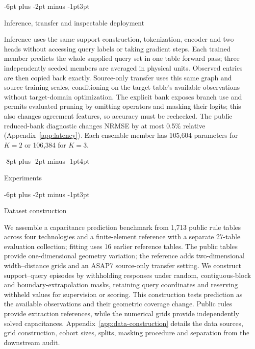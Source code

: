 \documentclass{article}
\makeatletter
\renewcommand{\section}{\@startsection{section}{1}{\z@}
  {-8pt plus -2pt minus -1pt}{4pt}{\large\sc\raggedright}}
\renewcommand{\subsection}{\@startsection{subsection}{2}{\z@}
  {-6pt plus -2pt minus -1pt}{3pt}{\normalsize\sc\raggedright}}
\makeatother
\begin{document}
\subsection{Inference, transfer and inspectable deployment}
\label{sec:deployment}

Inference uses the same support construction, tokenization, encoder and two
heads without accessing query labels or taking gradient steps. Each trained
member predicts the whole supplied query set in one table forward pass;
three independently seeded members are averaged in physical units. Observed
entries are then copied back exactly. Source-only transfer uses this same graph
and source training scales, conditioning on the target table's available
observations without target-domain optimization.
The explicit bank exposes branch use and permits evaluated pruning by omitting
operators and masking their logits; this also changes agreement features, so
accuracy must be rechecked. The public reduced-bank diagnostic changes NRMSE
by at most 0.5\% relative (Appendix~\ref{app:latency}). Each ensemble member has
105{,}604 parameters for $K=2$ or 106{,}384 for $K=3$.

\section{Experiments}
\label{sec:experiments}

\subsection{Dataset construction}
\label{sec:data}

We assemble a capacitance prediction benchmark from 1{,}713 public rule tables
across four technologies and a finite-element reference with a separate
27-table evaluation collection; fitting uses 16 earlier reference tables.
The public tables provide one-dimensional geometry variation; the reference
adds two-dimensional width--distance grids and an ASAP7 source-only transfer
setting. We construct support--query episodes by withholding responses under
random, contiguous-block and boundary-extrapolation masks, retaining query
coordinates and reserving withheld values for supervision or scoring.
This construction tests prediction as the available observations and their
geometric coverage change. Public rules provide extraction references, while
the numerical grids provide independently solved capacitances.
Appendix~\ref{app:data-construction} details the data sources, grid construction,
cohort sizes, splits, masking procedure and separation from the downstream audit.
\end{document}
